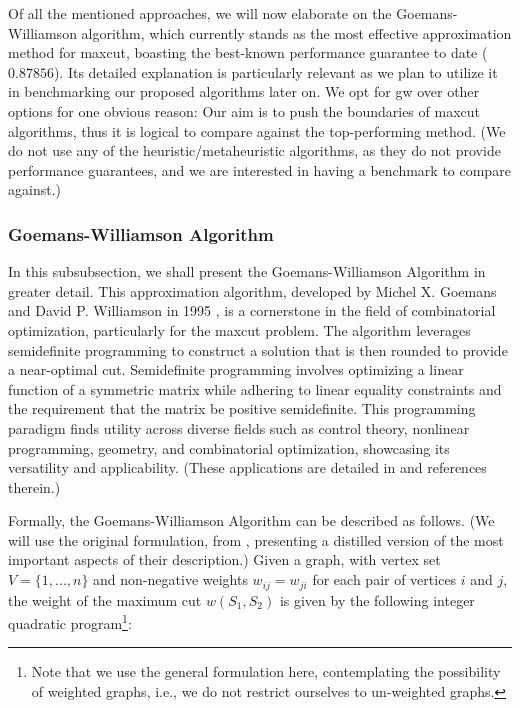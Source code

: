 Of all the mentioned approaches, we will now elaborate on the Goemans-Williamson algorithm, which currently stands as the most effective approximation method for \acrshort{maxcut}, boasting the best-known performance guarantee to date ($0.87856$). Its detailed explanation is particularly relevant as we plan to utilize it in benchmarking our proposed algorithms later on. We opt for \acrshort{gw} over other options for one obvious reason: Our aim is to push the boundaries of \acrshort{maxcut} algorithms, thus it is logical to compare against the top-performing method. (We do not use any of the heuristic/metaheuristic algorithms, as they do not provide performance guarantees, and we are interested in having a benchmark to compare against.)

\subsubsection{Goemans-Williamson Algorithm}
\label{subsubsection:GW_Algorithm}

In this subsubsection, we shall present the Goemans-Williamson Algorithm in greater detail. This approximation algorithm, developed by Michel X. Goemans and David P. Williamson in 1995 \cite{GW-Algorithm}, is a cornerstone in the field of combinatorial optimization, particularly for the \acrshort{maxcut} problem. The algorithm leverages semidefinite programming to construct a solution that is then rounded to provide a near-optimal cut. Semidefinite programming involves optimizing a linear function of a symmetric matrix while adhering to linear equality constraints and the requirement that the matrix be positive semidefinite. This programming paradigm finds utility across diverse fields such as control theory, nonlinear programming, geometry, and combinatorial optimization, showcasing its versatility and applicability. (These applications are detailed in \cite{GW-Algorithm} and references therein.)

Formally, the Goemans-Williamson Algorithm can be described as follows. (We will use the original formulation, from \cite{GW-Algorithm}, presenting a distilled version of the most important aspects of their description.) Given a graph, with vertex set $V = \{1,..., n\}$ and non-negative weights $w_{ij} = w_{ji}$ for each pair of vertices $i$ and $j$, the weight of the maximum cut $w(S_1, S_2)$ is given by the following integer quadratic program\footnote{Note that we use the general formulation here, contemplating the possibility of weighted graphs, i.e., we do not restrict ourselves to un-weighted graphs.}:

